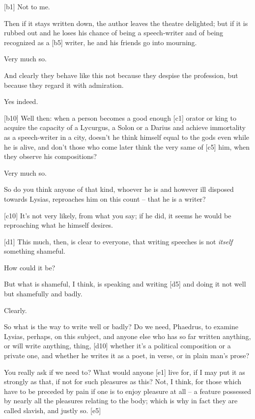 {[}b1{]}  Not to me.

 Then if it stays written down, the
author leaves the
theatre delighted; but if it is rubbed out and he loses his chance of
being a speech-writer and of being recognized as a {[}b5{]} writer, he
and his friends go into mourning.

 Very much so.

 And clearly they behave like this not because they despise the
profession, but because they regard it with admiration.

 Yes indeed.

{[}b10{]}  Well then: when a person becomes a good enough
{[}c1{]} orator or king to acquire the capacity of a Lycurgus, a Solon
or a Darius and achieve
immortality as a speech-writer in a city, doesn't he think himself equal
to the gods even while he is alive, and don't those who come later think
the very same of {[}c5{]} him, when they observe his compositions?

 Very much so.

 So do you think anyone of that kind, whoever he is and however
ill disposed towards Lysias, reproaches him on this count -- that he is
a writer?

{[}c10{]}  It's not very likely, from what you say; if he did,
it seems he would be reproaching what he himself desires.

{[}d1{]}  This much, then, is clear to everyone, that writing
speeches is not {\em itself} something shameful.

 How could it be?

 But what is shameful, I think, is speaking and writing {[}d5{]}
and doing it not well but shamefully and badly.

 Clearly.

 So what is the way to write well or badly? Do we need,
Phaedrus, to examine Lysias, perhaps, on this subject, and anyone else
who has so far written anything, or will write anything, thing,
{[}d10{]} whether it's a political composition or a private one, and
whether he writes it as a poet, in verse, or in plain man's prose?

 You really ask if we need to? What would anyone {[}e1{]} live
for, if I may put it as strongly as that, if not for such pleasures as
this? Not, I think, for those which have to be preceded by pain if one
is to enjoy pleasure at all -- a feature possessed by nearly all the
pleasures relating to the body; which is why in fact they are called
slavish, and justly so.
{[}e5{]}

